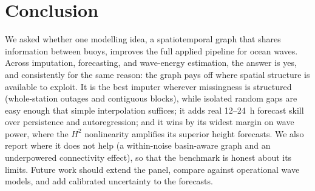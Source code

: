 \documentclass[11pt]{article}
\begin{document}
\section{Conclusion}
\label{sec:conclusion}
We asked whether one modelling idea, a spatiotemporal graph that shares
information between buoys, improves the full applied pipeline for ocean waves.
Across imputation, forecasting, and wave-energy estimation, the answer is yes,
and consistently for the same reason: the graph pays off where spatial structure
is available to exploit. It is the best imputer wherever missingness is
structured (whole-station outages and contiguous blocks), while isolated random
gaps are easy enough that simple interpolation suffices; it adds real 12--24~h
forecast skill over
persistence and autoregression; and it wins by its widest margin on wave power,
where the $H^{2}$ nonlinearity amplifies its superior height forecasts. We also
report where it does not help (a within-noise basin-aware graph and an
underpowered connectivity effect), so that the benchmark is honest about its
limits. Future work should extend the panel, compare against operational wave
models, and add calibrated uncertainty to the forecasts.



\end{document}

